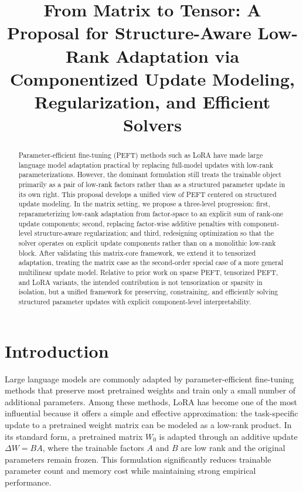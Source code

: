 \documentclass[11pt]{article}
\title{\textbf{From Matrix to Tensor: A Proposal for Structure-Aware Low-Rank Adaptation via Componentized Update Modeling, Regularization, and Efficient Solvers}}
\author{}
\date{}
\begin{document}
\maketitle

\begin{abstract}
Parameter-efficient fine-tuning (PEFT) methods such as LoRA have made large language model adaptation practical by replacing full-model updates with low-rank parameterizations. However, the dominant formulation still treats the trainable object primarily as a pair of low-rank factors rather than as a structured parameter update in its own right. This proposal develops a unified view of PEFT centered on structured update modeling. In the matrix setting, we propose a three-level progression: first, reparameterizing low-rank adaptation from factor-space to an explicit sum of rank-one update components; second, replacing factor-wise additive penalties with component-level structure-aware regularization; and third, redesigning optimization so that the solver operates on explicit update components rather than on a monolithic low-rank block. After validating this matrix-core framework, we extend it to tensorized adaptation, treating the matrix case as the second-order special case of a more general multilinear update model. Relative to prior work on sparse PEFT, tensorized PEFT, and LoRA variants, the intended contribution is not tensorization or sparsity in isolation, but a unified framework for preserving, constraining, and efficiently solving structured parameter updates with explicit component-level interpretability.
\end{abstract}

\section{Introduction}

Large language models are commonly adapted by parameter-efficient fine-tuning methods that preserve most pretrained weights and train only a small number of additional parameters. Among these methods, LoRA has become one of the most influential because it offers a simple and effective approximation: the task-specific update to a pretrained weight matrix can be modeled as a low-rank product. In its standard form, a pretrained matrix $W_0$ is adapted through an additive update $\Delta W = BA$, where the trainable factors $A$ and $B$ are low rank and the original parameters remain frozen. This formulation significantly reduces trainable parameter count and memory cost while maintaining strong empirical performance.
\end{document}
